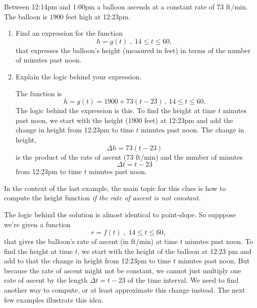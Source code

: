 \documentclass{ximera}
\begin{document}
\begin{example}  \label{Ex:IUDFr3f3fgl}
Between 12:14pm and 1:00pm a balloon ascends at a constant rate of $73$ ft/min. The balloon is $1900$ feet high at 12:23pm.

\begin{enumerate}
\item Find an expression for the function 
\[
       h=g(t)\; , \; 14\leq t \leq 60, 
\]
that expresses the balloon's height (measured in feet) in terms of the number of minutes past noon.

\item Explain the logic behind your expression.

\begin{explanation}
The function is
\[
    h = g(t) = 1900 + 73(t-23) \, , \, 14\leq t \leq 60.
\]
The logic behind the expression is this. To find the height at time $t$ minutes past noon, we start with the height ($1900$ feet) at 12:23pm and add the change in height from 12:23pm to time $t$ minutes past noon. The change in height,
\[
   \Delta h = 73(t-23)
\]
is the product of the rate of ascent ($73$ ft/min) and the number of minutes
\[
  \Delta t = t - 23
\]
from 12:23pm to time $t$ minutes past noon.
\end{explanation}
\end{enumerate}
\end{example}

In the context of the last example, the main topic for this class is how to compute the height function \emph{if the rate of ascent is not constant.}

The logic behind the solution is almost identical to point-slope. So supppose we're given a function
\[
   r =f(t) \; , \; 14\leq t \leq 60, 
\]
that gives the balloon's rate of ascent (in ft/min) at time $t$ minutes past noon. To find the height at time $t$, we start with the height of the balloon at 12:23 pm and add to that the change in height from 12:23pm to time $t$ minutes past noon. But because the rate of ascent might not be constant, we cannot just multiply one rate of ascent by the length $\Delta t = t-23$ of the time interval. We need to find another way to compute, or at least approximate this change instead. The next few examples illustrate this idea.
\end{document}
